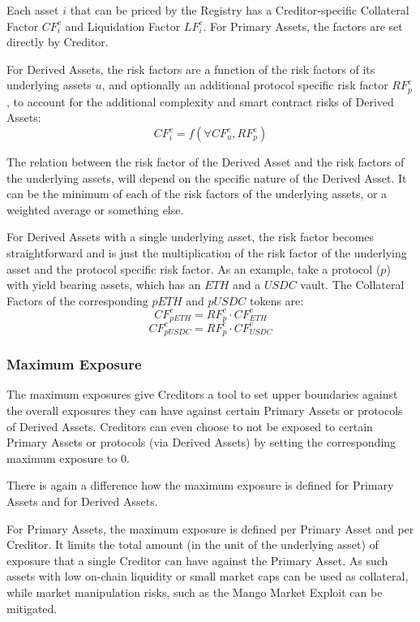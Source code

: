 \documentclass[sigconf,nonacm]{acmart}
\begin{document}
Each asset $i$ that can be priced by the Registry has a Creditor-specific Collateral Factor $CF_{i}^{c}$ and Liquidation Factor $LF_{i}^{c}$.
For Primary Assets, the factors are set directly by Creditor.

For Derived Assets, the risk factors are a function of the risk factors of its underlying assets $u$, and optionally an additional protocol specific risk factor $RF_{p}^{c}$,
to account for the additional complexity and smart contract risks of Derived Assets:
\begin{equation}
    CF_{i}^{c} = f(\forall CF_{u}^{c}, RF_{p}^{c})
\end{equation}

The relation between the risk factor of the Derived Asset and the risk factors of the underlying assets,
will depend on the specific nature of the Derived Asset.
It can be the minimum of each of the risk factors of the underlying assets, or a weighted average or something else.

For Derived Assets with a single underlying asset,
the risk factor becomes straightforward and is just the multiplication of the risk factor of the underlying asset and the protocol specific risk factor.
As an example, take a protocol ($p$) with yield bearing assets, which has an $ETH$ and a $USDC$ vault.
The Collateral Factors of the corresponding $pETH$ and $pUSDC$ tokens are:
\begin{equation}
    CF_{pETH}^{c} = RF_{p}^{c} \cdot CF_{ETH}^{c}
\end{equation}
\begin{equation}
    CF_{pUSDC}^{c} = RF_{p}^{c} \cdot CF_{USDC}^{c}
\end{equation}

\subsubsection{Maximum Exposure}
The maximum exposures give Creditors a tool to set upper boundaries against the overall exposures they can have against certain Primary Assets or protocols of Derived Assets.
Creditors can even choose to not be exposed to certain Primary Assets or protocols (via Derived Assets) by setting the corresponding maximum exposure to 0.

There is again a difference how the maximum exposure is defined for Primary Assets and for Derived Assets.

For Primary Assets, the maximum exposure is defined per Primary Asset and per Creditor.
It limits the total amount (in the unit of the underlying asset) of exposure that a single Creditor can have against the Primary Asset.
As such assets with low on-chain liquidity or small market caps can be used as collateral,
while market manipulation risks, such as the Mango Market Exploit\cite{coindeskDeFiExchange} can be mitigated.
\end{document}
